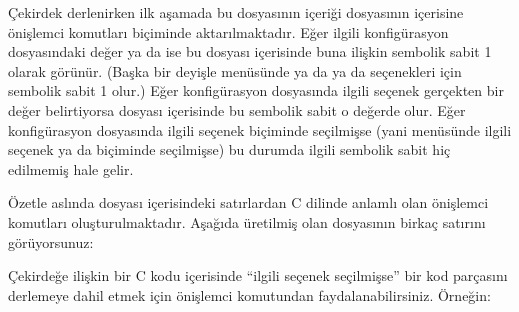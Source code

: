 \documentclass[a4paper,10pt,turkish]{sphinxmanual}
\begin{document}
\sphinxAtStartPar
Çekirdek derlenirken ilk aşamada bu  dosyasının içeriği
 dosyasının içerisine  önişlemci komutları biçiminde
aktarılmaktadır. Eğer ilgili konfigürasyon dosyasındaki değer  ya da  ise bu 
dosyası içerisinde buna ilişkin sembolik sabit 1 olarak görünür. (Başka bir deyişle 
menüsünde \sphinxcode{\sphinxupquote{{[}*{]}}} ya da \sphinxcode{\sphinxupquote{\textless{}*\textgreater{}}} ya da  seçenekleri için sembolik sabit 1 olur.) Eğer konfigürasyon
dosyasında ilgili seçenek gerçekten bir değer belirtiyorsa  dosyası içerisinde bu sembolik
sabit o değerde olur. Eğer konfigürasyon dosyasında ilgili seçenek  biçiminde seçilmişse (yani
 menüsünde ilgili seçenek \sphinxcode{\sphinxupquote{{[} {]}}} ya da \sphinxcode{\sphinxupquote{\textless{} \textgreater{}}} biçiminde seçilmişse) bu durumda
ilgili sembolik sabit hiç  edilmemiş hale gelir.

\sphinxAtStartPar
Özetle aslında  dosyası içerisindeki satırlardan C dilinde anlamlı olan  önişlemci
komutları oluşturulmaktadır. Aşağıda üretilmiş olan  dosyasının birkaç satırını görüyorsunuz:

\begin{sphinxVerbatim}[commandchars=\\\{\}]
\end{sphinxVerbatim}

\sphinxAtStartPar
Çekirdeğe ilişkin bir C kodu içerisinde “ilgili seçenek seçilmişse” bir kod parçasını derlemeye dahil
etmek için  önişlemci komutundan faydalanabilirsiniz. Örneğin:
\end{document}
